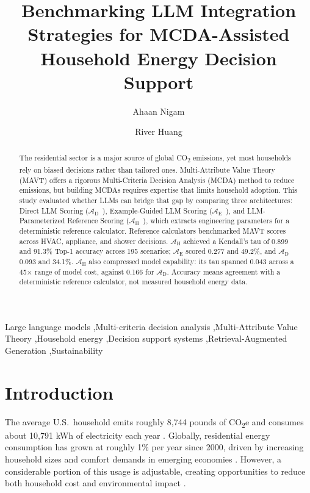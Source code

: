 \documentclass[final,3p,times]{elsarticle}
\begin{document}
\begin{frontmatter}
\title{Benchmarking LLM Integration Strategies for MCDA-Assisted Household Energy Decision Support}
\author{Ahaan Nigam}
\author{River Huang}
\begin{abstract}
The residential sector is a major source of global CO\textsubscript{2} emissions, yet most households rely on biased decisions rather than tailored ones. Multi-Attribute Value Theory (MAVT) offers a rigorous Multi-Criteria Decision Analysis (MCDA) method to reduce emissions, but building MCDAs requires expertise that limits household adoption. This study evaluated whether LLMs can bridge that gap by comparing three architectures: Direct LLM Scoring ($\mathcal{A}_{\text{D}}$~), Example-Guided LLM Scoring ($\mathcal{A}_{\text{E}}$~), and LLM-Parameterized Reference Scoring ($\mathcal{A}_{\text{H}}$~), which extracts engineering parameters for a deterministic reference calculator. Reference calculators benchmarked MAVT scores across HVAC, appliance, and shower decisions. $\mathcal{A}_{\text{H}}$ achieved a Kendall's tau of 0.899 and 91.3\% Top-1 accuracy across 195 scenarios; $\mathcal{A}_{\text{E}}$ scored 0.277 and 49.2\%, and $\mathcal{A}_{\text{D}}$ 0.093 and 34.1\%. $\mathcal{A}_{\text{H}}$ also compressed model capability: its tau spanned 0.043 across a 45$\times$ range of model cost, against 0.166 for $\mathcal{A}_{\text{D}}$. Accuracy means agreement with a deterministic reference calculator, not measured household energy data.\end{abstract}
\begin{keyword}
Large language models \sep Multi-criteria decision analysis \sep Multi-Attribute Value Theory \sep Household energy \sep Decision support systems \sep Retrieval-Augmented Generation \sep Sustainability
\end{keyword}
\end{frontmatter}

\section{Introduction}
\label{sec1}
The average U.S.\ household emits roughly 8{,}744 pounds of CO\textsubscript{2}e and consumes about 10{,}791 kWh of electricity each year \cite{epa_household2024,eia_faq_electricity2024}. Globally, residential energy consumption has grown at roughly 1\% per year since 2000, driven by increasing household sizes and comfort demands in emerging economies \cite{GONZALEZTORRES2022112428}. However, a considerable portion of this usage is adjustable, creating opportunities to reduce both household cost and environmental impact \cite{dietz2009,ohler2020}.
\end{document}

